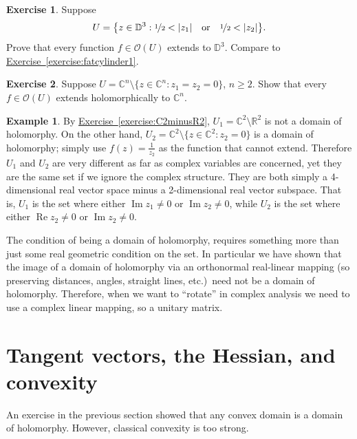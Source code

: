 \documentclass[12pt,openany]{book}
\renewcommand{\Re}{\operatorname{Re}}
\renewcommand{\Im}{\operatorname{Im}}
\newcommand{\sabs}[1]{\lvert {#1} \rvert}
\newcommand{\C}{{\mathbb{C}}}
\newcommand{\R}{{\mathbb{R}}}
\newcommand{\D}{{\mathbb{D}}}
\newcommand{\sO}{{\mathscr{O}}}
\theoremstyle{plain}
\theoremstyle{remark}
\theoremstyle{definition}
\newenvironment{exbox}{%
    \def\FrameCommand{\vrule width 1pt \relax\hspace {10pt}}%
    \MakeFramed {\advance \hsize -\width \FrameRestore }%
}{%
    \endMakeFramed
}
\theoremstyle{exercise}
\newtheorem{exercise}{Exercise}[section]
\theoremstyle{example}
\newtheorem{example}[thm]{Example}
\newcommand{\exerciseref}[1]{\hyperref[#1]{Exercise~\ref*{#1}}}
\begin{document}
\begin{exbox}
\begin{exercise} \label{exercise:fatcylinder2}
Suppose 
\begin{equation*}
U = \bigl\{ z \in \D^3 :
\nicefrac{1}{2} < \sabs{z_1} \quad\text{or}\quad
\nicefrac{1}{2} < \sabs{z_2} \bigr\} .
\end{equation*}
Prove that every function $f \in \sO(U)$ extends to $\D^3$.
Compare to \exerciseref{exercise:fatcylinder1}.
\end{exercise}

\begin{exercise} \label{exercise:codim2extends}
Suppose $U = \C^n \setminus \{ z \in \C^n : z_1 = z_2 = 0 \}$, $n
\geq 2$.  Show that every $f \in \sO(U)$ extends holomorphically to
$\C^n$.
\end{exercise}
\end{exbox}

\begin{example}
By
\exerciseref{exercise:C2minusR2},
$U_1 = \C^2 \setminus \R^2$
is not a domain of holomorphy.  On the other hand,
$U_2 = \C^2 \setminus \{ z \in \C^2 : z_2 = 0 \}$ is a domain of holomorphy;
simply
use $f(z) = \frac{1}{z_2}$ as the function that cannot extend.
Therefore $U_1$ and $U_2$ are very different as far as complex variables are
concerned, yet they are the same set if we ignore the complex structure.
They are both simply a 4-dimensional real vector space minus a 2-dimensional
real vector subspace.  That is, $U_1$ is the set
where either $\Im z_1 \not= 0$ or $\Im z_2 \not= 0$,
while $U_2$ is the set
where either $\Re z_2 \not= 0$ or $\Im z_2 \not= 0$.

The condition of being a domain of holomorphy,
requires something more than just some real geometric condition on the
set.  In particular we have shown that the image of a domain of holomorphy
via an orthonormal
real-linear mapping 
(so preserving distances, angles, straight lines,
etc.)\ need not be a domain of holomorphy.  Therefore, when we want to
``rotate'' in complex analysis we need to use a complex linear mapping,
so a unitary matrix.
\end{example}


\section{Tangent vectors, the Hessian, and convexity}

An exercise in the previous section showed that any convex domain is a
domain of holomorphy.  However, classical convexity is too strong.
\end{document}
